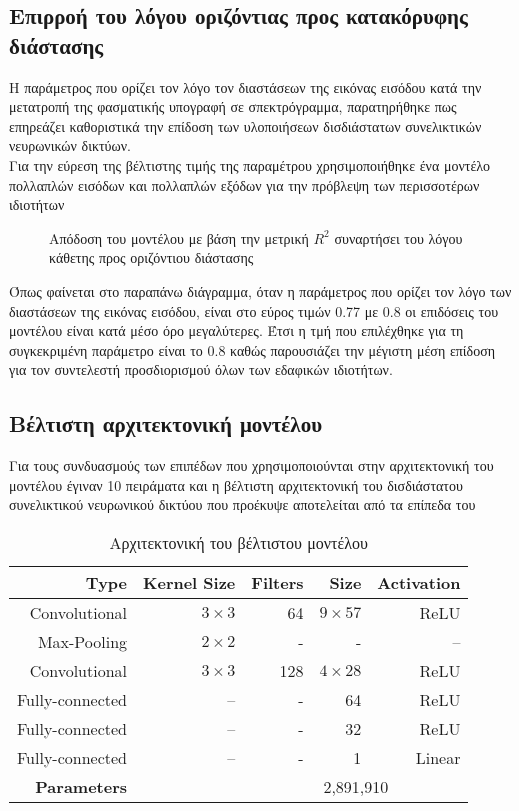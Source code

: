 \subsection{Επιρροή του λόγου οριζόντιας προς κατακόρυφης διάστασης}
Η παράμετρος που ορίζει τον λόγο τον διαστάσεων της εικόνας εισόδου κατά την μετατροπή της φασματικής υπογραφή σε σπεκτρόγραμμα, παρατηρήθηκε πως επηρεάζει καθοριστικά την επίδοση των υλοποιήσεων δισδιάστατων συνελικτικών νευρωνικών δικτύων.\\
Για την εύρεση της βέλτιστης τιμής της παραμέτρου  χρησιμοποιήθηκε ένα μοντέλο πολλαπλών εισόδων και πολλαπλών εξόδων για την πρόβλεψη των περισσοτέρων ιδιοτήτων

\begin{figure}[H]
  \begin{center}
    
    \caption{Απόδοση του μοντέλου με βάση την μετρική $R^2$ συναρτήσει του λόγου κάθετης προς οριζόντιου διάστασης}
  \end{center}
\end{figure}

Όπως φαίνεται στο παραπάνω διάγραμμα, όταν η παράμετρος που ορίζει τον λόγο των διαστάσεων της εικόνας εισόδου, είναι στο εύρος τιμών 0.77 με 0.8 οι επιδόσεις του μοντέλου είναι κατά μέσο όρο μεγαλύτερες. Έτσι η τμή που επιλέχθηκε για τη συγκεκριμένη παράμετρο είναι το 0.8 καθώς παρουσιάζει την μέγιστη μέση επίδοση για τον συντελεστή προσδιορισμού όλων των εδαφικών ιδιοτήτων.

\subsection{Βέλτιστη αρχιτεκτονική μοντέλου}

Για τους συνδυασμούς των επιπέδων που χρησιμοποιούνται στην αρχιτεκτονική του μοντέλου έγιναν 10 πειράματα και η βέλτιστη αρχιτεκτονική του δισδιάστατου συνελικτικού νευρωνικού δικτύου που προέκυψε αποτελείται από τα επίπεδα του 

\begin{table}[H]
    \centering
    \caption{Αρχιτεκτονική του βέλτιστου μοντέλου}
    \label{fig:best_model}
    \begin{tabular}{@{}rrrrr@{}}\toprule
        Type&Kernel Size&Filters&Size&Activation\\
        \midrule
        Convolutional&$3 \times 3$&64&$9 \times 57$&ReLU\\
        Max-Pooling&$2 \times 2$&-&-&–\\
        Convolutional&$3 \times 3$&128&$4 \times 28$&ReLU\\
        Fully-connected&–&-&64&ReLU\\
        Fully-connected&–&-&32&ReLU\\
        Fully-connected&–&-&1&Linear\\
        \addlinespace
        \textbf{Parameters}&&\multicolumn{3}{c}{2,891,910}\\
        \bottomrule
    \end{tabular}
\end{table}

